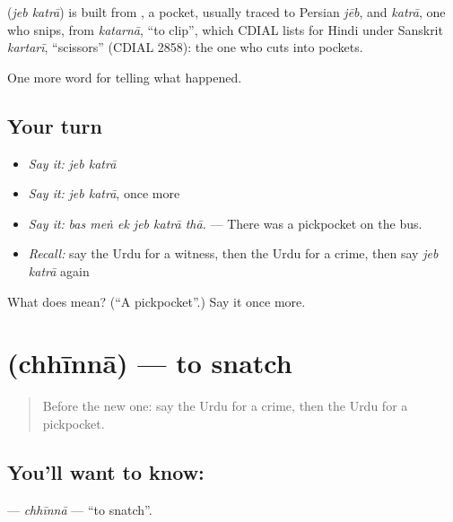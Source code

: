 \begin{cousinweb}
\textbf{ } (\emph{jeb katrā}) is built from \textbf{}, a pocket, usually traced to Persian \emph{jēb}, and \emph{katrā}, one who snips, from \emph{katarnā}, \textquotedblleft{}to clip\textquotedblright{}, which CDIAL lists for Hindi under Sanskrit \emph{kartarī}, \textquotedblleft{}scissors\textquotedblright{} (CDIAL 2858): the one who cuts into pockets.
\end{cousinweb}

\begin{grammarlens}[title={What you've built}]
One more word for telling what happened.
\end{grammarlens}

\subsection*{Your turn}
\begin{itemize}
\raggedright
  \item \emph{Say it:} \emph{jeb katrā}
  \item \emph{Say it:} \emph{jeb katrā}, once more
  \item \emph{Say it:} \emph{bas meṅ ek jeb katrā thā.} — There was a pickpocket on the bus.
  \item \emph{Recall:} say the Urdu for a witness, then the Urdu for a crime, then say \emph{jeb katrā} again
\end{itemize}

\begin{tcolorbox}[breakable,colback=teal!4,colframe=teal!35!black,title={Before you move on}]
What does   mean? (\textquotedblleft{}A pickpocket\textquotedblright{}.) Say it once more.
\end{tcolorbox}
\section[\texorpdfstring{\ur{چھیننا} (chhīnnā)}{چھیننا (chhīnnā)}]{ (chhīnnā) — to snatch}

\label{lesson:UR-C277-chhinna}



\begin{quote}
Before the new one: say the Urdu for a crime, then the Urdu for a pickpocket.
\end{quote}

\subsection*{You'll want to know: }
\textbf{} — \emph{chhīnnā} — \textquotedblleft{}to snatch\textquotedblright{}.


